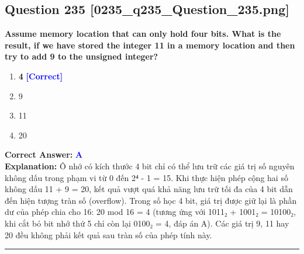 \documentclass[11pt,a4paper]{article}
\begin{document}
\begin{minipage}{\textwidth}
\subsection*{Question 235 \quad \footnotesize{[0235\_q235\_Question\_235.png]}}
\noindent \textbf{Assume memory location that can only hold four bits. What is the result, if we have stored the integer 11 in a memory location and then try to add 9 to the unsigned integer?}

\begin{enumerate}[label=\Alph*.]
    \item \textbf{4} \hfill \textcolor{blue}{\textbf{[Correct]}}
    \item 9
    \item 11
    \item 20
\end{enumerate}

\noindent \textbf{Correct Answer:} \textcolor{blue}{\textbf{A}} \\[2pt]
\noindent \textbf{Explanation:} Ô nhớ có kích thước 4 bit chỉ có thể lưu trữ các giá trị số nguyên không dấu trong phạm vi từ 0 đến 2⁴ - 1 = 15. Khi thực hiện phép cộng hai số không dấu 11 + 9 = 20, kết quả vượt quá khả năng lưu trữ tối đa của 4 bit dẫn đến hiện tượng tràn số (overflow). Trong số học 4 bit, giá trị được giữ lại là phần dư của phép chia cho 16: 20 mod 16 = 4 (tương ứng với 1011₂ + 1001₂ = 10100₂, khi cắt bỏ bit nhớ thứ 5 chỉ còn lại 0100₂ = 4, đáp án A). Các giá trị 9, 11 hay 20 đều không phải kết quả sau tràn số của phép tính này.

\par\vspace{0.3cm}
\hrule
\vspace{0.3cm}
\end{minipage}
\end{document}
